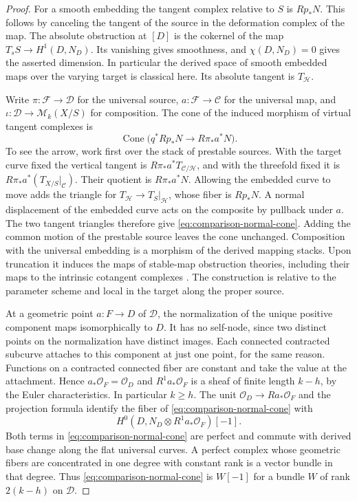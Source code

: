 \begin{proof}
For a smooth embedding the tangent complex relative to $S$ is
$Rp_*N$. This follows by canceling the tangent of the source in the
deformation complex of the map. The absolute obstruction at $[D]$
is the cokernel of the map $T_sS\to H^1(D,N_D)$. Its vanishing
gives smoothness, and $\chi(D,N_D)=0$ gives the asserted dimension.
In particular the derived space of smooth embedded maps over the
varying target is classical here. Its absolute tangent is $T_\mathcal H$.

Write $\pi:\mathcal F\to\mathcal D$ for the universal source,
$a:\mathcal F\to\mathcal C$ for the universal map, and
$\iota:\mathcal D\to\mathcal M_k(X/S)$ for composition. The cone of
the induced morphism of virtual tangent complexes is
\begin{equation}\label{eq:comparison-normal-cone}
 \operatorname{Cone}\bigl(q^*Rp_*N\longrightarrow R\pi_*a^*N\bigr).
\end{equation}
To see the arrow, work first over the stack of prestable sources.
With the target curve fixed the vertical tangent is
$R\pi_*a^*T_{\mathcal C/\mathcal H}$, and with the threefold fixed it is
$R\pi_*a^*(T_{X/S}|_{\mathcal C})$. Their quotient is
$R\pi_*a^*N$. Allowing the embedded curve to move adds the
triangle for $T_\mathcal H\to T_S|_\mathcal H$, whose fiber is $Rp_*N$.
A normal displacement of the embedded curve acts on the composite
by pullback under $a$. The two tangent triangles therefore give
\eqref{eq:comparison-normal-cone}. Adding the common motion of the
prestable source leaves the cone unchanged. Composition with the
universal embedding is a morphism of the derived mapping stacks.
Upon truncation it induces the maps of stable-map obstruction
theories, including their maps to the intrinsic cotangent complexes
\cite[\S\S1, 2.2]{STV}. The construction is
relative to the parameter scheme and local in the target along the
proper source.

At a geometric point $a:F\to D$ of $\mathcal D$, the normalization
of the unique positive component maps isomorphically to $D$.
It has no self-node, since two distinct points on the normalization
have distinct images. Each connected contracted subcurve attaches
to this component at just one point, for the same reason. Functions
on a contracted connected fiber are constant and take the value at
the attachment. Hence $a_*\mathcal O_F=\mathcal O_D$ and
$R^1a_*\mathcal O_F$ is a sheaf of finite length $k-h$, by the
Euler characteristics. In particular $k\ge h$. The unit
$\mathcal O_D\to Ra_*\mathcal O_F$ and the projection formula
identify the fiber of \eqref{eq:comparison-normal-cone} with
\[
 H^0(D,N_D\otimes R^1a_*\mathcal O_F)[-1].
\]
Both terms in \eqref{eq:comparison-normal-cone} are perfect and
commute with derived base change along the flat universal curves.
A perfect complex whose geometric fibers are concentrated in one
degree with constant rank is a vector bundle in that degree.
Thus \eqref{eq:comparison-normal-cone} is $W[-1]$ for a bundle
$W$ of rank $2(k-h)$ on $\mathcal D$.


\end{proof}
